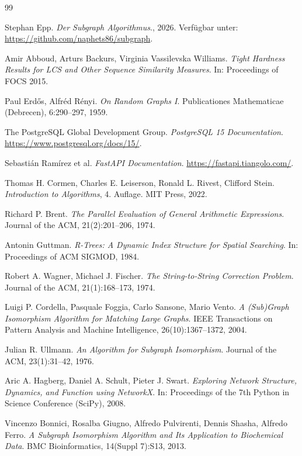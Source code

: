 \documentclass[a4paper,12pt, twoside]{report}
\theoremstyle{definition}
\begin{document}
\begin{thebibliography}{99}

Stephan Epp.
\emph{Der Subgraph Algorithmus}., 2026.
Verfügbar unter: \url{https://github.com/naphets86/subgraph}.

Amir Abboud, Arturs Backurs, Virginia Vassilevska Williams.
\emph{Tight Hardness Results for LCS and Other Sequence Similarity Measures}.
In: Proceedings of FOCS 2015.

Paul Erdős, Alfréd Rényi.
\emph{On Random Graphs I}.
Publicationes Mathematicae (Debrecen), 6:290--297, 1959.

The PostgreSQL Global Development Group.
\emph{PostgreSQL 15 Documentation}.
\url{https://www.postgresql.org/docs/15/}.

Sebastián Ramírez et al.
\emph{FastAPI Documentation}.
\url{https://fastapi.tiangolo.com/}.

Thomas H. Cormen, Charles E. Leiserson, Ronald L. Rivest, Clifford Stein.
\emph{Introduction to Algorithms}, 4. Auflage.
MIT Press, 2022.

Richard P. Brent.
\emph{The Parallel Evaluation of General Arithmetic Expressions}.
Journal of the ACM, 21(2):201--206, 1974.

Antonin Guttman.
\emph{R-Trees: A Dynamic Index Structure for Spatial Searching}.
In: Proceedings of ACM SIGMOD, 1984.

Robert A. Wagner, Michael J. Fischer.
\emph{The String-to-String Correction Problem}.
Journal of the ACM, 21(1):168--173, 1974.

Luigi P. Cordella, Pasquale Foggia, Carlo Sansone, Mario Vento.
\emph{A (Sub)Graph Isomorphism Algorithm for Matching Large Graphs}.
IEEE Transactions on Pattern Analysis and Machine Intelligence, 26(10):1367--1372, 2004.

Julian R. Ullmann.
\emph{An Algorithm for Subgraph Isomorphism}.
Journal of the ACM, 23(1):31--42, 1976.

Aric A. Hagberg, Daniel A. Schult, Pieter J. Swart.
\emph{Exploring Network Structure, Dynamics, and Function using NetworkX}.
In: Proceedings of the 7th Python in Science Conference (SciPy), 2008.

Vincenzo Bonnici, Rosalba Giugno, Alfredo Pulvirenti, Dennis Shasha, Alfredo Ferro.
\emph{A Subgraph Isomorphism Algorithm and Its Application to Biochemical Data}.
BMC Bioinformatics, 14(Suppl 7):S13, 2013.


\end{thebibliography}
\end{document}
